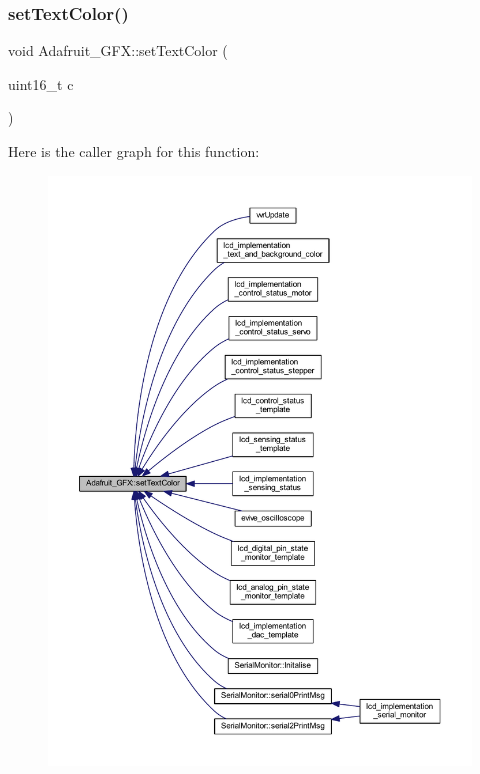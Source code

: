 \mbox{\label{class_adafruit___g_f_x_a59178a0e0c845a14a39b457c43567dd9}} 
\subsubsection{\texorpdfstring{set\+Text\+Color()}{setTextColor()}\hspace{0.1cm}{\footnotesize\ttfamily [1/2]}}
{\footnotesize\ttfamily void Adafruit\+\_\+\+G\+F\+X\+::set\+Text\+Color (\begin{DoxyParamCaption}\item[{uint16\+\_\+t}]{c }\end{DoxyParamCaption})}

Here is the caller graph for this function\+:
\nopagebreak
\begin{figure}[H]
\begin{center}
\leavevmode
\includegraphics[width=350pt]{d9/d97/class_adafruit___g_f_x_a59178a0e0c845a14a39b457c43567dd9_icgraph}
\end{center}
\end{figure}
\mbox{\label{class_adafruit___g_f_x_ab6e88c585d3ab6b4f95199361f224fc6}} 
